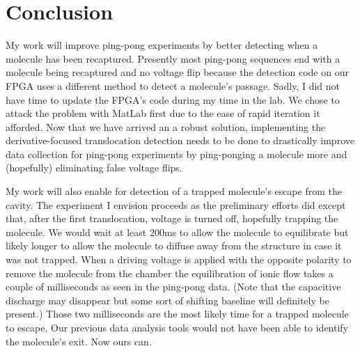 \documentclass[aps,prl,preprint,groupedaddress]{revtex4}
\begin{document}

\section{Conclusion}

My work will improve ping-pong experiments by better detecting when a molecule has been recaptured.
Presently most ping-pong sequences end with a molecule being recaptured and no voltage flip because the detection code on our FPGA uses a different method to detect a molecule's passage.
Sadly, I did not have time to update the FPGA's code during my time in the lab.
We chose to attack the problem with MatLab first due to the ease of rapid iteration it afforded.
Now that we have arrived an a robust solution, implementing the derivative-focused translocation detection needs to be done to drastically improve data collection for ping-pong experiments by ping-ponging a molecule more and (hopefully) eliminating false voltage flips.

My work will also enable for detection of a trapped molecule's escape from the cavity.
The experiment I envision proceeds as the preliminary efforts did except that, after the first translocation, voltage is turned off, hopefully trapping the molecule.
We would wait at least 200ms to allow the molecule to equilibrate but likely longer to allow the molecule to diffuse away from the structure in case it was not trapped.
When a driving voltage is applied with the opposite polarity to remove the molecule from the chamber the equilibration of ionic flow takes a couple of milliseconds as seen in the ping-pong data.
(Note that the capacitive discharge may disappear but some sort of shifting baseline will definitely be present.)
Those two milliseconds are the most likely time for a trapped molecule to escape.
Our previous data analysis tools would not have been able to identify the molecule's exit.
Now ours can.



\end{document}
